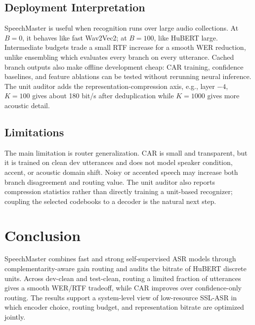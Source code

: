 \documentclass{article}
\begin{document}
\subsection{Deployment Interpretation}

SpeechMaster is useful when recognition runs over large audio collections. At
$B=0$, it behaves like fast Wav2Vec2; at $B=100$, like HuBERT large. Intermediate
budgets trade a small RTF increase for a smooth WER reduction, unlike ensembling
which evaluates every branch on every utterance. Cached branch outputs also make
offline development cheap: CAR training, confidence baselines, and feature
ablations can be tested without rerunning neural inference. The unit auditor
adds the representation-compression axis, e.g., layer $-4$, $K=100$ gives about
180 bit/s after deduplication while $K=1000$ gives more acoustic detail.

\subsection{Limitations}

The main limitation is router generalization. CAR is small and transparent, but
it is trained on clean dev utterances and does not model speaker condition,
accent, or acoustic domain shift. Noisy or accented speech may increase both
branch disagreement and routing value. The unit auditor also reports compression
statistics rather than directly training a unit-based recognizer; coupling the
selected codebooks to a decoder is the natural next step.

\section{Conclusion}

SpeechMaster combines fast and strong self-supervised ASR models through
complementarity-aware gain routing and audits the bitrate of HuBERT discrete
units. Across dev-clean and test-clean, routing a limited fraction of utterances
gives a smooth WER/RTF tradeoff, while CAR improves over confidence-only
routing. The results support a system-level view of low-resource SSL-ASR in
which encoder choice, routing budget, and representation bitrate are optimized
jointly.
\end{document}
